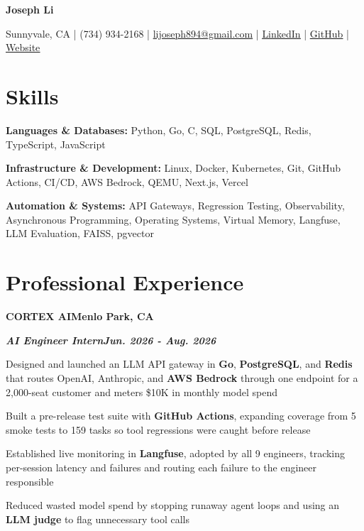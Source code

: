 \documentclass[10pt]{article}
\renewcommand{\resumeheader}[2]{%
  {\centering\fontsize{16}{18}\selectfont\bfseries #1\par}%
  \vspace{4pt}%
  {\centering\fontsize{10.5}{13}\selectfont #2\par}%
  \vspace{6pt}%
}
\renewcommand{\skill}[2]{\textbf{#1:} #2\par\vspace{1.5pt}}
\newcommand{\job}[4]{%
  \vspace{0pt}%
  \textbf{\MakeUppercase{#1}}\hfill\textbf{#2}\par
  \vspace{0.5pt}%
  \textbf{\textit{#3}}\hfill\textbf{\textit{#4}}\par
}
\begin{document}
\resumeheader{Joseph Li}{%
Sunnyvale, CA | (734) 934-2168 | \href{mailto:lijoseph894@gmail.com}{lijoseph894@gmail.com} | \href{https://www.linkedin.com/in/lijoseph894/}{\underline{LinkedIn}} | \href{https://github.com/josephl894}{\underline{GitHub}} | \href{https://josephl894.github.io}{\underline{Website}}}

\section{Skills}
\skill{Languages \& Databases}{Python, Go, C, SQL, PostgreSQL, Redis, TypeScript, JavaScript}
\skill{Infrastructure \& Development}{Linux, Docker, Kubernetes, Git, GitHub Actions, CI/CD, AWS Bedrock, QEMU, Next.js, Vercel}
\skill{Automation \& Systems}{API Gateways, Regression Testing, Observability, Asynchronous Programming, Operating Systems, Virtual Memory, Langfuse, LLM Evaluation, FAISS, pgvector}

\section{Professional Experience}
\job{Cortex AI}{Menlo Park, CA}{AI Engineer Intern}{Jun. 2026 - Aug. 2026}
\begin{bullets}
  \item Designed and launched an LLM API gateway in \textbf{Go}, \textbf{PostgreSQL}, and \textbf{Redis} that routes OpenAI, Anthropic, and \textbf{AWS Bedrock} through one endpoint for a 2,000-seat customer and meters \$10K in monthly model spend
  \item Built a pre-release test suite with \textbf{GitHub Actions}, expanding coverage from 5 smoke tests to 159 tasks so tool regressions were caught before release
  \item Established live monitoring in \textbf{Langfuse}, adopted by all 9 engineers, tracking per-session latency and failures and routing each failure to the engineer responsible
  \item Reduced wasted model spend by stopping runaway agent loops and using an \textbf{LLM judge} to flag unnecessary tool calls
\end{bullets}
\end{document}
